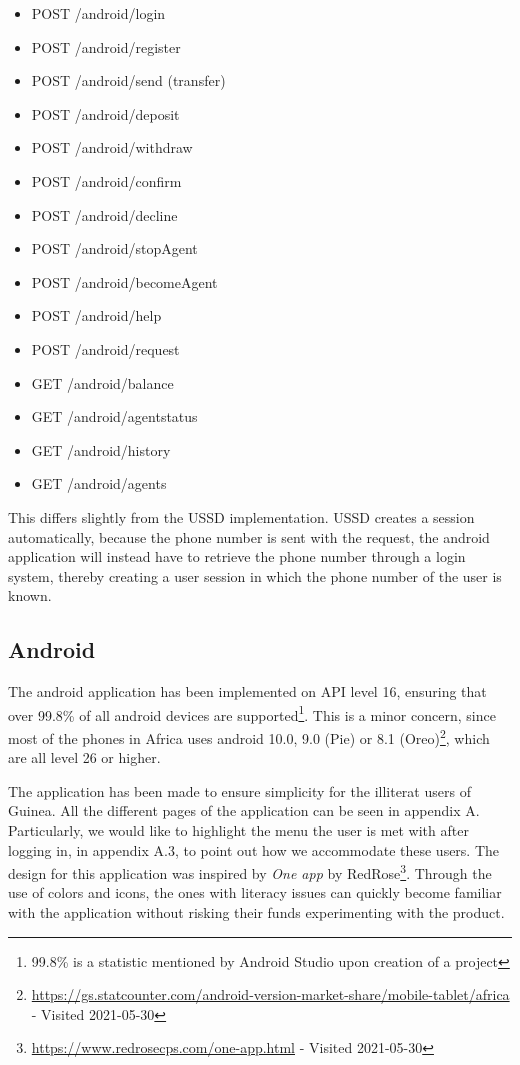 \documentclass[11pt, a4paper]{article}
\begin{document}
\begin{itemize}
  \item POST /android/login
  \item POST /android/register
  \item POST /android/send (transfer)
  \item POST /android/deposit
  \item POST /android/withdraw
  \item POST /android/confirm
  \item POST /android/decline
  \item POST /android/stopAgent
  \item POST /android/becomeAgent
  \item POST /android/help
  \item POST /android/request
  \item GET /android/balance
  \item GET /android/agentstatus
  \item GET /android/history
  \item GET /android/agents
\end{itemize}

This differs slightly from the USSD implementation. USSD creates a session automatically, because the phone number is sent with the request, the android application will instead have to retrieve the phone number through a login system, thereby creating a user session in which the phone number of the user is known.

\subsection{Android}
The android application has been implemented on API level 16, ensuring that over 99.8\% of all android devices are supported\footnote{99.8\% is a statistic mentioned by Android Studio upon creation of a project}. This is a minor concern, since most of the phones in Africa uses android 10.0, 9.0 (Pie) or 8.1 (Oreo)\footnote{\url{https://gs.statcounter.com/android-version-market-share/mobile-tablet/africa} - Visited 2021-05-30}, which are all level 26 or higher.

The application has been made to ensure simplicity for the illiterat users of Guinea. All the different pages of the application can be seen in appendix A. Particularly, we would like to highlight the menu the user is met with after logging in, in appendix A.3, to point out how we accommodate these users. The design for this application was inspired by \textit{One app} by RedRose\footnote{\url{https://www.redrosecps.com/one-app.html} - Visited 2021-05-30}. Through the use of colors and icons, the ones with literacy issues can quickly become familiar with the application without risking their funds experimenting with the product.
\end{document}
